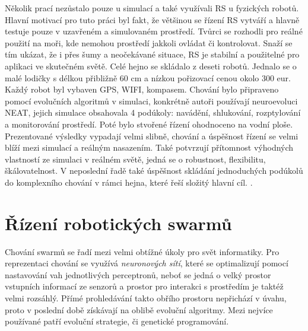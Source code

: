 Několik prací nezůstalo pouze u simulací a také využívali RS u fyzických robotů. Hlavní motivací pro tuto práci byl fakt, že většinou se řízení RS vytváří  a hlavně testuje pouze v uzavřeném a simulovaném prostředí. Tvůrci se rozhodli pro reálné použití na moři, kde nemohou prostředí jakkoli ovládat či kontrolovat. Snaží se tím ukázat, že i přes šumy a neočekávané situace, RS je stabilní a použitelné pro aplikaci ve skutečném světě. Celé hejno se skládalo z deseti robotů. Jednalo se o malé lodičky s délkou přibližně 60 cm a nízkou pořizovací cenou okolo 300 eur. Každý robot byl  vybaven GPS, WIFI, kompasem. Chování bylo připraveno pomocí evolučních algoritmů v simulaci, konkrétně autoři používají neuroevoluci NEAT, jejich simulace obsahovala 4 podúkoly: navádění, shlukování, rozptylování a monitorování prostředí. Poté bylo stvořené řízení ohodnoceno na vodní ploše. Prezentované výsledky vypadají velmi slibně, chování a úspěšnost řízení se velmi blíží mezi simulací a reálným nasazením. Také potvrzují přítomnost výhodných vlastností ze simulaci v reálném světě, jedná se o robustnost, flexibilitu, škálovatelnost. V neposlední řadě také úspěšnost skládání jednoduchých podúkolů do komplexního chování v rámci hejna, které řeší složitý hlavní cíl.  \citep{aquaticRobots}. 
\section{Řízení robotických swarmů}
Chování swarmů se řadí mezi velmi obtížné úkoly pro svět informatiky. Pro reprezentaci chování se využívá \textit{neuronových sítí}, které se optimalizují pomocí nastavování vah jednotlivých perceptronů, neboť se jedná o velký prostor vstupních informací ze senzorů a prostor pro interakci s prostředím je taktéž velmi rozsáhlý. Přímé prohledávání takto obřího prostoru nepřichází v úvahu, proto v poslední době získávají na oblibě evoluční algoritmy. Mezi nejvíce používané patří evoluční strategie, či genetické programování. \par 

